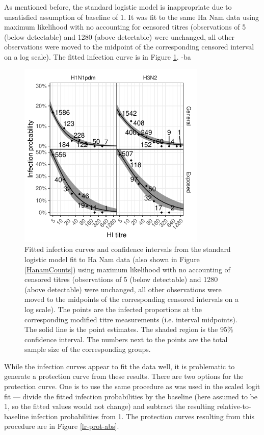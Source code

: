 \documentclass[12pt]{article}
\begin{document}
As mentioned before, the standard logistic model is inappropriate due to unsatisfied assumption of baseline of 1. It was fit to the same Ha Nam data using maximum likelihood with no accounting for censored titres (observations of 5 (below detectable) and 1280 (above detectable) were unchanged, all other observations were moved to the midpoint of the corresponding censored interval on a log scale). The fitted infection curve is in Figure \ref{lr-inf}.
-ba
\begin{figure}[htp]
	\centering
	\includegraphics[width=0.8\textwidth]{../fit-logistic-plot/hanam-hi-inf.pdf}
	\caption{
	Fitted infection curves and confidence intervals from the standard logistic model fit to Ha Nam data (also shown in Figure \ref{HanamCounts}) using maximum likelihood with no accounting of censored titres (observations of 5 (below detectable) and 1280 (above detectable) were unchanged, all other observations were moved to the midpoints of the corresponding censored intervals on a log scale). The points are the infected proportions at the corresponding modified titre measurements (i.e. interval midpoints). The solid line is the point estimates. The shaded region is the 95\% confidence interval. The numbers next to the points are the total sample size of the corresponding groups.
	}
	\label{lr-inf}
\end{figure}

\pagebreak

While the infection curves appear to fit the data well, it is problematic to generate a protection curve from these results. There are two options for the protection curve. One is to use the same procedure as was used in the scaled logit fit --- divide the fitted infection probabilities by the baseline (here assumed to be 1, so the fitted values would not change) and subtract the resulting relative-to-baseline infection probabilities from 1. The protection curves resulting from this procedure are in Figure \ref{lr-prot-abs}.
\end{document}
